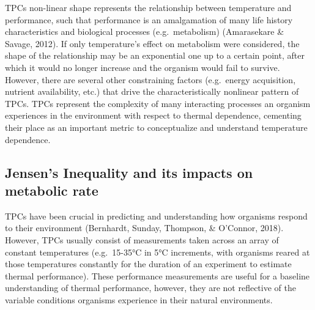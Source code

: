 \documentclass[12pt,twoside]{reedthesis}
\begin{document}
TPCs non-linear shape represents the relationship between temperature and performance, such that performance is an amalgamation of many life history characteristics and biological processes (e.g.~metabolism) (Amarasekare \& Savage, 2012). If only temperature's effect on metabolism were considered, the shape of the relationship may be an exponential one up to a certain point, after which it would no longer increase and the organism would fail to survive. However, there are several other constraining factors (e.g.~energy acquisition, nutrient availability, etc.) that drive the characteristically nonlinear pattern of TPCs. TPCs represent the complexity of many interacting processes an organism experiences in the environment with respect to thermal dependence, cementing their place as an important metric to conceptualize and understand temperature dependence.

\hypertarget{jensens-inequality-and-its-impacts-on-metabolic-rate}{%
\subsection{Jensen's Inequality and its impacts on metabolic rate}\label{jensens-inequality-and-its-impacts-on-metabolic-rate}}

TPCs have been crucial in predicting and understanding how organisms respond to their environment (Bernhardt, Sunday, Thompson, \& O'Connor, 2018). However, TPCs usually consist of measurements taken across an array of constant temperatures (e.g.~15-35°C in 5°C increments, with organisms reared at those temperatures constantly for the duration of an experiment to estimate thermal performance). These performance measurements are useful for a baseline understanding of thermal performance, however, they are not reflective of the variable conditions organisms experience in their natural environments.
\end{document}
